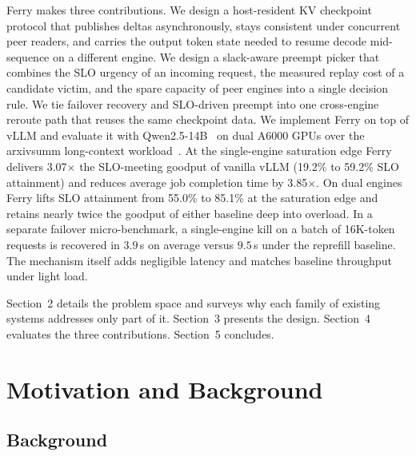 Ferry makes three contributions. We design a host-resident KV checkpoint protocol that publishes deltas asynchronously, stays consistent under concurrent peer readers, and carries the output token state needed to resume decode mid-sequence on a different engine. We design a slack-aware preempt picker that combines the SLO urgency of an incoming request, the measured replay cost of a candidate victim, and the spare capacity of peer engines into a single decision rule. We tie failover recovery and SLO-driven preempt into one cross-engine reroute path that reuses the same checkpoint data. We implement Ferry on top of vLLM and evaluate it with Qwen2.5-14B~\cite{qwen25} on dual A6000 GPUs over the arxivsumm long-context workload~\cite{cohan2018arxiv}. At the single-engine saturation edge Ferry delivers 3.07$\times$ the SLO-meeting goodput of vanilla vLLM (19.2\% to 59.2\% SLO attainment) and reduces average job completion time by 3.85$\times$. On dual engines Ferry lifts SLO attainment from 55.0\% to 85.1\% at the saturation edge and retains nearly twice the goodput of either baseline deep into overload. In a separate failover micro-benchmark, a single-engine kill on a batch of 16K-token requests is recovered in $3.9$\,s on average versus $9.5$\,s under the reprefill baseline. The mechanism itself adds negligible latency and matches baseline throughput under light load.


Section~2 details the problem space and surveys why each family of existing systems addresses only part of it. Section~3 presents the design. Section~4 evaluates the three contributions. Section~5 concludes.

\section{Motivation and Background}

\subsection{Background}


